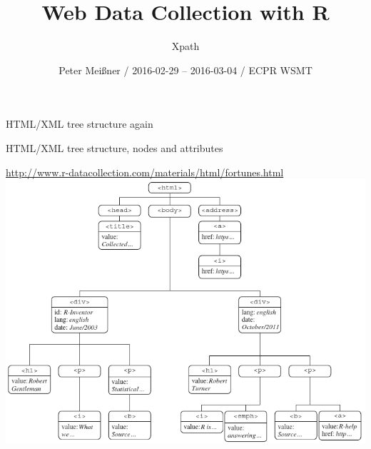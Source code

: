 \documentclass[ignorenonframetext,]{beamer}
\title{Web Data Collection with R}
\subtitle{Xpath}
\author{Peter Meißner / 2016-02-29 -- 2016-03-04 / ECPR WSMT}
\date{}
\begin{document}
\frame{\titlepage}

\begin{frame}
\tableofcontents[hideallsubsections]
\end{frame}

\begin{frame}{HTML/XML tree structure again}

\begin{block}{HTML/XML tree structure, nodes and attributes}

\url{http://www.r-datacollection.com/materials/html/fortunes.html}
\includegraphics{tree.png}

\end{block}

\end{frame}
\end{document}
